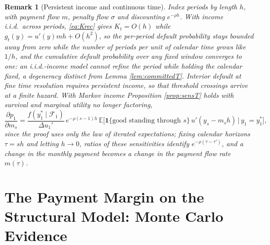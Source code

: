 \documentclass[12pt,english]{article}
\newtheorem{remark}[theorem]{Remark}
\begin{document}
\begin{remark}[Persistent income and continuous time]\label{appendix:continuous}
Index periods by length $h$, with payment flow $m$, penalty flow $\sigma$ and discounting $e^{-\rho h}$. With income i.i.d.\ across periods, \eqref{eq:Krec} gives $K_t = O(h)$ while $g_t(y) = u'(y)mh + O(h^2)$, so the per-period default probability stays bounded away from zero while the number of periods per unit of calendar time grows like $1/h$, and the cumulative default probability over any fixed window converges to one: an i.i.d.-income model cannot refine the period while holding the calendar fixed, a degeneracy distinct from Lemma \ref{lem:committedT}. Interior default at fine time resolution requires persistent income, so that threshold crossings arrive at a finite hazard. With Markov income Proposition \ref{prop:sensT} holds with survival and marginal utility no longer factoring,
\[
\frac{\partial p_1}{\partial m_s} = \frac{f(y_1^* \mid \mathcal{F}_1)}{\Delta u_1'}\, e^{-\rho(s-1)h}\, \mathbb{E}\big[\mathbf{1}\{\text{good standing through } s\}\, u'(y_s - m_s h) \,\big|\, y_1 = y_1^*\big],
\]
since the proof uses only the law of iterated expectations; fixing calendar horizons $\tau = sh$ and letting $h \to 0$, ratios of these sensitivities identify $e^{-\rho(\tau - \tau')}$, and a change in the monthly payment becomes a change in the payment flow rate $m(\tau)$.
\end{remark}



\section{The Payment Margin on the Structural Model: Monte Carlo Evidence}\label{appendix:mcliquidity}
\end{document}

